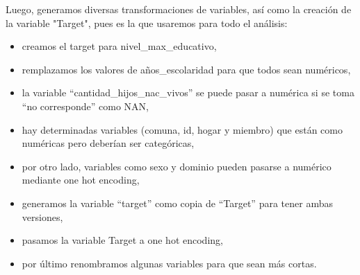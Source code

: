 \documentclass[a4paper]{article}
\begin{document}
    Luego, generamos diversas transformaciones de variables, así como la creación de la variable "Target", pues es la que usaremos para todo el análisis:
    \begin{itemize}
        \item creamos el target para nivel\_max\_educativo,
        \item remplazamos los valores de años\_escolaridad para que todos sean numéricos,
        \item la variable ``cantidad\_hijos\_nac\_vivos'' se puede pasar a numérica si se toma ``no corresponde'' como NAN,
        \item hay determinadas variables (comuna, id, hogar y miembro) que están como numéricas pero deberían ser categóricas,
        \item por otro lado, variables como sexo y dominio pueden pasarse a numérico mediante one hot encoding,
        \item generamos la variable ``target'' como copia de ``Target'' para tener ambas versiones,
        \item pasamos la variable Target a one hot encoding,
        \item por último renombramos algunas variables para que sean más cortas.
    \end{itemize}
\end{document}
